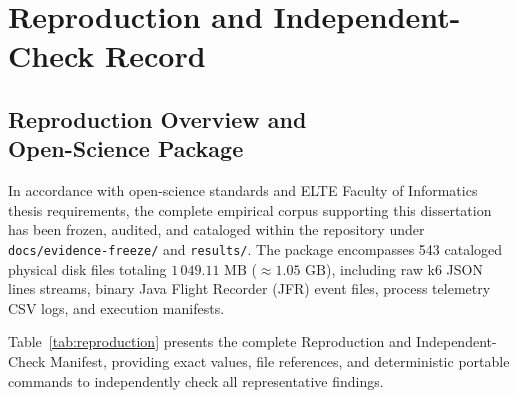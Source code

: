 \chapter{Reproduction and Independent-Check Record}
\label{app:reproducibility}

\section[Reproduction Overview and Open-Science Package]{Reproduction Overview and\\ Open-Science Package}
\label{sec:repro-overview}

In accordance with open-science standards and ELTE Faculty of Informatics thesis requirements, the complete empirical corpus supporting this dissertation has been frozen, audited, and cataloged within the repository under \texttt{docs/evidence-freeze/} and \texttt{results/}. The package encompasses 543 cataloged physical disk files totaling $1\,049.11\text{ MB}$ ($\approx 1.05\text{ GB}$), including raw k6 JSON lines streams, binary Java Flight Recorder (JFR) event files, process telemetry CSV logs, and execution manifests.

Table~\ref{tab:reproduction} presents the complete Reproduction and Independent-Check Manifest, providing exact values, file references, and deterministic portable commands to independently check all representative findings.

